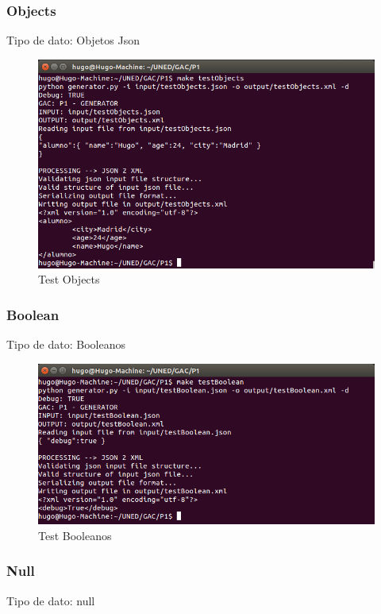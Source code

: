 \documentclass[a4paper,11pt]{book}
\begin{document}
\subsubsection{Objects}
Tipo de dato: Objetos Json

\begin{figure}[H]  
\centering 
\includegraphics[scale=0.35]{imagenes/testObjects.png}
\caption{ Test Objects  }  
\end{figure} 

\subsubsection{Boolean}
Tipo de dato: Booleanos

\begin{figure}[H]  
\centering 
\includegraphics[scale=0.35]{imagenes/testBoolean.png}
\caption{ Test Booleanos  }  
\end{figure} 

\subsubsection{Null}
Tipo de dato: null
\end{document}
